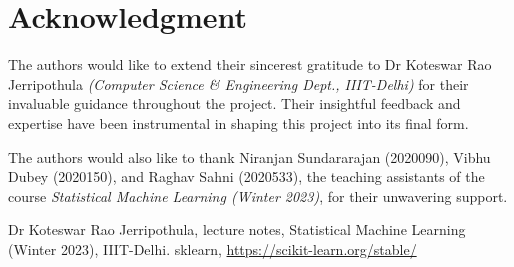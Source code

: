 \documentclass[conference]{IEEEtran}
\begin{document}
    \section*{Acknowledgment}
    \label{sec:acknowledgment}
    The authors would like to extend their sincerest gratitude to Dr Koteswar Rao Jerripothula
    \textit{(Computer Science \& Engineering Dept., IIIT-Delhi)} for their invaluable guidance throughout the project.
    Their insightful feedback and expertise have been instrumental in shaping this project into its final form.

    The authors would also like to thank Niranjan Sundararajan (2020090), Vibhu Dubey (2020150), and Raghav Sahni (2020533),
    the teaching assistants of the course \textit{Statistical Machine Learning (Winter 2023)}, for their unwavering support.

    \begin{thebibliography}{00}
         Dr Koteswar Rao Jerripothula, lecture notes, Statistical Machine Learning (Winter 2023), IIIT-Delhi.
         sklearn, \underline{https://scikit-learn.org/stable/}
    \end{thebibliography}
\end{document}
